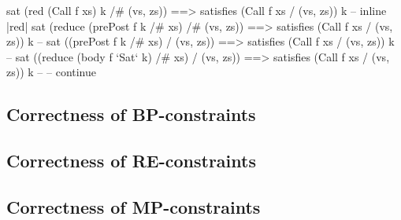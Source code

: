 
\begin{code}
sat (red (Call f xs) k /# (vs, zs)) ==> satisfies (Call f xs / (vs, zs)) k
    -- inline |red|
sat (reduce (prePost f k /# xs) /# (vs, zs)) ==> satisfies (Call f xs / (vs, zs)) k
    -- 
sat ((prePost f k /# xs) / (vs, zs)) ==> satisfies (Call f xs / (vs, zs)) k
    -- 
sat ((reduce (body f `Sat` k) /# xs) / (vs, zs)) ==> satisfies (Call f xs / (vs, zs)) k
    -- 
    -- continue
\end{code}





\subsection{Correctness of BP-constraints}


\subsection{Correctness of RE-constraints}


\subsection{Correctness of MP-constraints}

